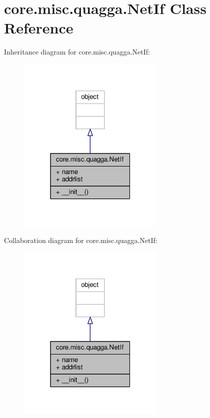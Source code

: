 \hypertarget{classcore_1_1misc_1_1quagga_1_1_net_if}{\section{core.\+misc.\+quagga.\+Net\+If Class Reference}
\label{classcore_1_1misc_1_1quagga_1_1_net_if}
}


Inheritance diagram for core.\+misc.\+quagga.\+Net\+If\+:
\nopagebreak
\begin{figure}[H]
\begin{center}
\leavevmode
\includegraphics[width=199pt]{classcore_1_1misc_1_1quagga_1_1_net_if__inherit__graph}
\end{center}
\end{figure}


Collaboration diagram for core.\+misc.\+quagga.\+Net\+If\+:
\nopagebreak
\begin{figure}[H]
\begin{center}
\leavevmode
\includegraphics[width=199pt]{classcore_1_1misc_1_1quagga_1_1_net_if__coll__graph}
\end{center}
\end{figure}
